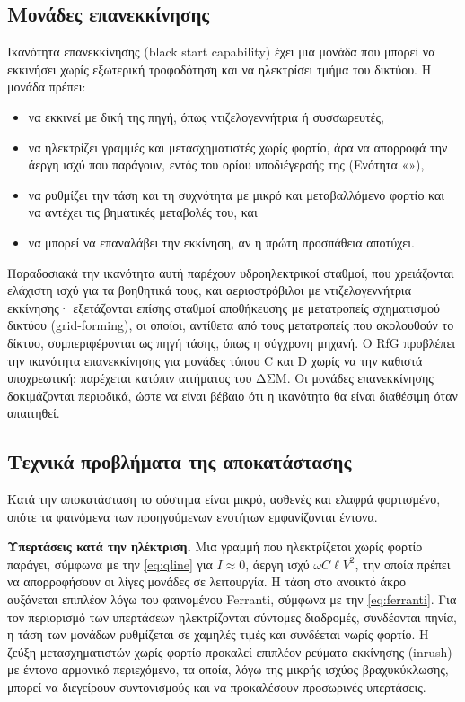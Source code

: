 \subsection{Μονάδες επανεκκίνησης}
\label{sec:blackstart}

Ικανότητα επανεκκίνησης (black start capability) έχει μια μονάδα που μπορεί να εκκινήσει χωρίς
εξωτερική τροφοδότηση και να ηλεκτρίσει τμήμα του δικτύου. Η μονάδα πρέπει:

\begin{itemize}
\item να εκκινεί με δική της πηγή, όπως ντιζελογεννήτρια ή συσσωρευτές,
\item να ηλεκτρίζει γραμμές και μετασχηματιστές χωρίς φορτίο, άρα να απορροφά την άεργη ισχύ που
      παράγουν, εντός του ορίου υποδιέγερσής της (Ενότητα «»),
\item να ρυθμίζει την τάση και τη συχνότητα με μικρό και μεταβαλλόμενο φορτίο και να αντέχει
      τις βηματικές μεταβολές του, και
\item να μπορεί να επαναλάβει την εκκίνηση, αν η πρώτη προσπάθεια αποτύχει.
\end{itemize}

Παραδοσιακά την ικανότητα αυτή παρέχουν υδροηλεκτρικοί σταθμοί, που χρειάζονται ελάχιστη ισχύ
για τα βοηθητικά τους, και αεριοστρόβιλοι με ντιζελογεννήτρια εκκίνησης· εξετάζονται επίσης
σταθμοί αποθήκευσης με μετατροπείς σχηματισμού δικτύου (grid-forming), οι οποίοι, αντίθετα
από τους μετατροπείς που ακολουθούν το δίκτυο, συμπεριφέρονται ως πηγή τάσης, όπως η σύγχρονη
μηχανή.
Ο RfG προβλέπει την ικανότητα επανεκκίνησης για μονάδες τύπου C και D χωρίς να την καθιστά
υποχρεωτική: παρέχεται κατόπιν αιτήματος του ΔΣΜ. Οι μονάδες επανεκκίνησης δοκιμάζονται
περιοδικά, ώστε να είναι βέβαιο ότι η ικανότητα θα είναι διαθέσιμη όταν απαιτηθεί.

\subsection{Τεχνικά προβλήματα της αποκατάστασης}
\label{sec:restoration-issues}

Κατά την αποκατάσταση το σύστημα είναι μικρό, ασθενές και ελαφρά φορτισμένο, οπότε τα
φαινόμενα των προηγούμενων ενοτήτων εμφανίζονται έντονα.

\textbf{Υπερτάσεις κατά την ηλέκτριση.} Μια γραμμή που ηλεκτρίζεται χωρίς φορτίο παράγει,
σύμφωνα με την \eqref{eq:qline} για $I \approx 0$, άεργη ισχύ $\omega C \ell V^2$, την οποία
πρέπει να απορροφήσουν οι λίγες μονάδες σε λειτουργία. Η τάση στο ανοικτό άκρο αυξάνεται
επιπλέον λόγω του φαινομένου Ferranti, σύμφωνα με την \eqref{eq:ferranti}. Για τον περιορισμό
των υπερτάσεων ηλεκτρίζονται σύντομες διαδρομές, συνδέονται πηνία, η τάση των μονάδων
ρυθμίζεται σε χαμηλές τιμές και συνδέεται νωρίς φορτίο. Η ζεύξη μετασχηματιστών χωρίς φορτίο
προκαλεί επιπλέον ρεύματα εκκίνησης (inrush) με έντονο αρμονικό περιεχόμενο, τα οποία, λόγω της
μικρής ισχύος βραχυκύκλωσης, μπορεί να διεγείρουν συντονισμούς και να προκαλέσουν προσωρινές
υπερτάσεις.

